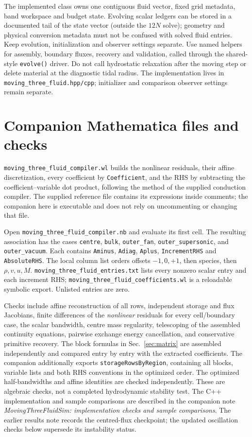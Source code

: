 \documentclass[11pt]{article}
\begin{document}
The implemented class owns one contiguous fluid vector, fixed grid
metadata, band workspace and budget state. Evolving scalar ledgers can
be stored in a documented tail of the state vector (outside the $12N$
solve); geometry and physical conversion metadata must not be confused
with solved fluid entries. Keep evolution, initialization and observer
settings separate. Use named helpers for assembly, boundary fluxes,
recovery and validation, called through the shared-style \texttt{evolve()}
driver. Do not call hydrostatic relaxation after the moving step or
delete material at the diagnostic tidal radius. The implementation lives in
\texttt{moving\_three\_fluid.hpp/cpp}; initializer and comparison observer
settings remain separate.

\section{Companion Mathematica files and checks}
\texttt{moving\_three\_fluid\_compiler.wl} builds the nonlinear residuals,
their affine discretization, every coefficient by \texttt{Coefficient},
and the RHS by subtracting the coefficient--variable dot product, following
the method of the supplied conduction compiler. The supplied reference
file contains its expressions inside comments; the companion here is
executable and does not rely on uncommenting or changing that file.

Open \texttt{moving\_three\_fluid\_compiler.nb} and evaluate its first
cell. The resulting association has the cases
\texttt{centre}, \texttt{bulk}, \texttt{outer\_fan},
\texttt{outer\_supersonic}, and \texttt{outer\_vacuum}.
Each contains \texttt{Aminus}, \texttt{Adiag}, \texttt{Aplus},
\texttt{IncrementRHS} and \texttt{AbsoluteRHS}. The local column list
orders offsets $-1,0,+1$, then species, then $\rho,v,u,M$.
\texttt{moving\_three\_fluid\_entries.txt} lists every nonzero scalar
entry and each increment RHS; \texttt{moving\_three\_fluid\_coefficients.wl}
is a reloadable symbolic export. Unlisted entries are zero.

Checks include affine reconstruction of all rows, independent storage
and flux Jacobians, finite differences of the \emph{nonlinear} residuals
for every cell/boundary case, the scalar bandwidth, centre mass regularity,
telescoping of the assembled continuity equations, pairwise exchange
energy cancellation, and conservative primitive recovery.
The block formulas in Sec.~\ref{sec:matrix} are assembled independently
and compared entry by entry with the extracted coefficients.
The companion additionally exports \texttt{storageRowsByRegion}, containing
all blocks, variable lists and both RHS conventions in the optimized order.
The optimized half-bandwidths and affine identities are checked independently.
These are algebraic checks, not a completed hydrodynamic stability test.
The C++ implementation and sample comparisons are described in the companion
note \emph{MovingThreeFluidSim: implementation checks and sample comparisons}.
The earlier results note records the centred-flux checkpoint; the
updated oscillation checks below supersede its instability status.
\end{document}
